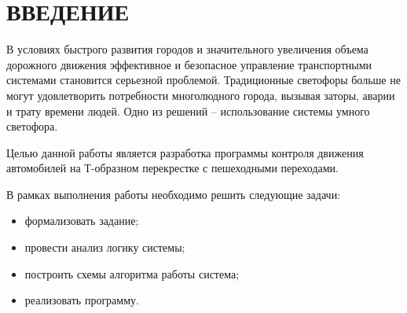 \section*{ВВЕДЕНИЕ}

В условиях быстрого развития городов и значительного увеличения объема дорожного движения эффективное и безопасное управление транспортными системами становится серьезной проблемой. Традиционные светофоры больше не могут удовлетворить потребности многолюдного города, вызывая заторы, аварии и трату времени людей. Одно из решений – использование системы умного светофора.

Целью данной работы является разработка программы контроля движения автомобилей на Т-образном перекрестке с пешеходными переходами.

В рамках выполнения работы необходимо решить следующие задачи:

\begin{itemize}
    \item формализовать задание;
    \item провести анализ логику системы;
    \item построить схемы алгоритма работы система;
    \item реализовать программу.
\end{itemize}